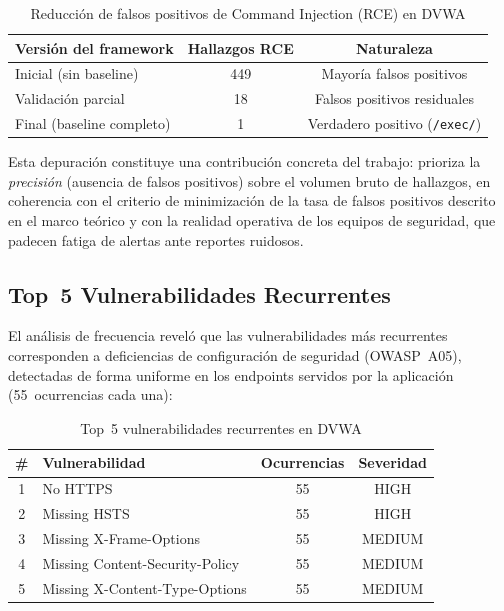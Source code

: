 \documentclass[12pt, a4paper]{article}
\begin{document}
\begin{table}[H]
    \centering
    \caption{Reducción de falsos positivos de Command Injection (RCE) en DVWA}
    \label{tab:fp}
    \begin{tabular}{l c c}
        \toprule
        \textbf{Versión del framework} & \textbf{Hallazgos RCE} & \textbf{Naturaleza} \\
        \midrule
        Inicial (sin baseline)     & 449 & Mayoría falsos positivos \\
        Validación parcial         & 18  & Falsos positivos residuales \\
        Final (baseline completo)  & 1   & Verdadero positivo (\texttt{/exec/}) \\
        \bottomrule
    \end{tabular}
\end{table}

Esta depuración constituye una contribución concreta del trabajo: prioriza la
\textit{precisión} (ausencia de falsos positivos) sobre el volumen bruto de
hallazgos, en coherencia con el criterio de minimización de la tasa de falsos
positivos descrito en el marco teórico y con la realidad operativa de los
equipos de seguridad, que padecen fatiga de alertas ante reportes ruidosos.

\subsection{Top~5 Vulnerabilidades Recurrentes}

El análisis de frecuencia reveló que las vulnerabilidades más recurrentes
corresponden a deficiencias de configuración de seguridad (OWASP~A05),
detectadas de forma uniforme en los endpoints servidos por la aplicación
(55~ocurrencias cada una):

\begin{table}[H]
    \centering
    \caption{Top~5 vulnerabilidades recurrentes en DVWA}
    \label{tab:top5}
    \begin{tabular}{c l c c}
        \toprule
        \textbf{\#} & \textbf{Vulnerabilidad} & \textbf{Ocurrencias} &
        \textbf{Severidad} \\
        \midrule
        1 & No HTTPS                         & 55 & HIGH \\
        2 & Missing HSTS                     & 55 & HIGH \\
        3 & Missing X-Frame-Options          & 55 & MEDIUM \\
        4 & Missing Content-Security-Policy   & 55 & MEDIUM \\
        5 & Missing X-Content-Type-Options    & 55 & MEDIUM \\
        \bottomrule
    \end{tabular}
\end{table}
\end{document}
